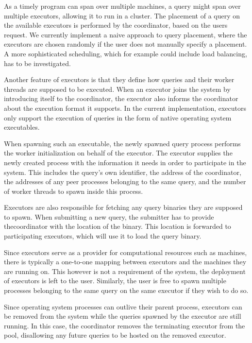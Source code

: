 As a timely program can span over multiple machines, a query might span
over multiple executors, allowing it to run in a cluster.
The placement of a query on the available executors
is performed by the coordinator, based on the users request.
We currently implement a naive approach to query placement, where the executors
are chosen randomly if the user does not manually specify a placement. A more
sophisticated scheduling, which for example could include load balancing,
has to be investigated.

Another feature of executors is that they define how queries and their
worker threads are supposed to be executed. When an executor joins
the system by introducing itself to the coordinator, the executor also informs
the coordinator about the execution format it supports. In the current
implementation, executors only support the execution of queries in the form of
native operating system executables.

When spawning such an executable, the newly spawned query process
performs the worker initialization on behalf of the executor. 
The executor supplies the newly created process with the information
it needs in order to participate in the system. This includes the query's own identifier,
the address of the coordinator, the addresses of any peer processes belonging to the 
same query, and the number of worker threads to spawn inside this process.

Executors are also responsible for fetching any query binaries they are supposed
to spawn. When submitting a new query, the submitter has to provide  thecoordinator
with the location of the binary. This location is forwarded to participating executors,
which will use it to load the query binary. 

Since executors serve as a provider for computational resources such as machines,
there is typically a one-to-one mapping between executors and the machines they
are running on. This however is not a requirement of the system, the deployment of
executors is left to the user. Similarly, the user is free to spawn multiple
processes belonging to the same query on the same executor if they wish to do so.

Since operating system processes can outlive their parent process, executors can
be removed from the system while the queries spawned by the executor are still
running. In this case, the coordinator removes the terminating executor from
the pool, disallowing any future queries to be hosted on the removed executor.

